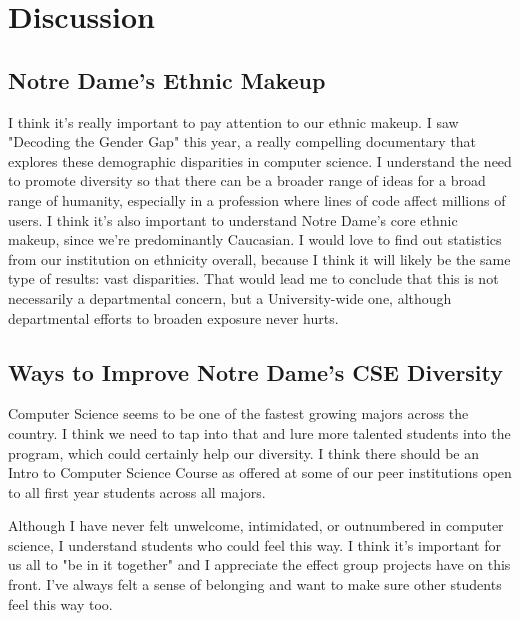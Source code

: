 \documentclass[letterpaper]{article}
\begin{document}
\section*{Discussion}

\subsection*{Notre Dame's Ethnic Makeup}

I think it's really important to pay attention to our ethnic makeup. I saw "Decoding the Gender Gap" this year, a really compelling documentary that explores these demographic disparities in computer science. I understand the need to promote diversity so that there can be a broader range of ideas for a broad range of humanity, especially in a profession where lines of code affect millions of users. I think it's also important to understand Notre Dame's core ethnic makeup, since we're predominantly Caucasian. I would love to find out statistics from our institution on ethnicity overall, because I think it will likely be the same type of results: vast disparities. That would lead me to conclude that this is not necessarily a departmental concern, but a University-wide one, although departmental efforts to broaden exposure never hurts.

\subsection*{Ways to Improve Notre Dame's CSE Diversity}

Computer Science seems to be one of the fastest growing majors across the country. I think we need to tap into that and lure more talented students into the program, which could certainly help our diversity. I think there should be an Intro to Computer Science Course as offered at some of our peer institutions open to all first year students across all majors.

Although I have never felt unwelcome, intimidated, or outnumbered in computer science, I understand students who could feel this way. I think it's important for us all to "be in it together" and I appreciate the effect group projects have on this front. I've always felt a sense of belonging and want to make sure other students feel this way too.
\end{document}
